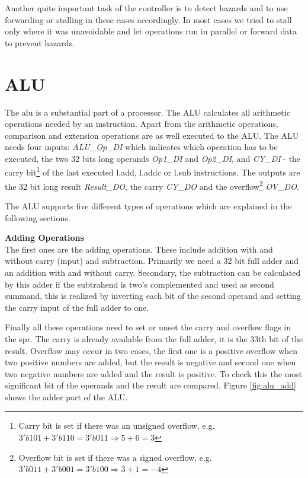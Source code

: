 Another quite important task of the controller is to detect hazards and to use forwarding or stalling in these cases accordingly. In most cases we tried to stall only where it was unavoidable and let operations run in parallel or forward data to prevent hazards.


\section{ALU}
The \gls{alu} is a substantial part of a processor. The ALU calculates all arithmetic operations needed by an instruction. Apart from the arithmetic operations, comparison and extension operations are as well executed to the ALU. The ALU needs four inputs: \textit{ALU\_Op\_DI} which indicates which operation has to be executed, the two 32 bits long operands \textit{Op1\_DI} and \textit{Op2\_DI}, and \textit{CY\_DI} - the carry bit\footnote{Carry bit is set if there was an unsigned overflow, e.g. $3'b101+3'b110=3'b011 \Rightarrow 5+6=3$} of the last executed l.add, l.addc or l.sub instructions. The outputs are the 32 bit long result \textit{Result\_DO}, the carry \textit{CY\_DO} and the overflow\footnote{Overflow bit is set if there was a signed overflow, e.g. $3'b011+3'b001=3'b100 \Rightarrow 3+1=-4$} \textit{OV\_DO}.

The ALU supports five different types of operations which are explained in the following sections.

\textbf{Adding Operations} \\
The first ones are the adding operations. These include addition with and without carry (input) and subtraction. Primarily we need a 32 bit full adder and an addition with and without carry. Secondary, the subtraction can be calculated by this adder if the subtrahend is two's complemented and used as second summand, this is realized by inverting each bit of the second operand and setting the carry input of the full adder to one.

Finally all these operations need to set or unset the carry and overflow flags in the \gls{spr}. The carry is already available from the full adder, it is the 33th bit of the result. Overflow may occur in two cases, the first one is a positive overflow when two positive numbers are added, but the result is negative and second one when two negative numbers are added and the result is positive. To check this the most significant bit of the operands and the result are compared. Figure \ref{fig:alu_add} shows the adder part of the ALU.

